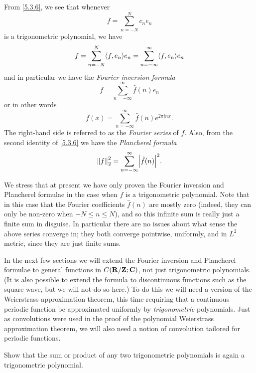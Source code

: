 \begin{additional corollary}\label{ac 5.3.1}
From \cref{5.3.6}, we see that whenever
\[
  f = \sum_{n = -N}^N c_n e_n
\]
is a trigonometric polynomial, we have
\[
  f = \sum_{n = -N}^N \inner*{f, e_n} e_n = \sum_{n = -\infty}^\infty \inner*{f, e_n} e_n
\]
and in particular we have the \emph{Fourier inversion formula}
\[
  f = \sum_{n = -\infty}^\infty \hat{f}(n) e_n
\]
or in other words
\[
  f(x) = \sum_{n = -\infty}^\infty \hat{f}(n) e^{2 \pi i n x}.
\]
The right-hand side is referred to as the \emph{Fourier series} of \(f\).
Also, from the second identity of \cref{5.3.6} we have the \emph{Plancherel formula}
\[
  \norm*{f}_2^2 = \sum_{n = -\infty}^\infty \abs{\hat{f}(n)}^2.
\]
\end{additional corollary}

\begin{remark}\label{5.3.8}
  We stress that at present we have only proven the Fourier inversion and Plancherel formulae in the case when \(f\) is a trigonometric polynomial.
  Note that in this case that the Fourier coefficients \(\hat{f}(n)\) are mostly zero (indeed, they can only be non-zero when \(-N \leq n \leq N\)), and so this infinite sum is really just a finite sum in disguise.
  In particular there are no issues about what sense the above series converge in;
  they both converge pointwise, uniformly, and in \(L^2\) metric, since they are just finite sums.
\end{remark}

\begin{note}
  In the next few sections we will extend the Fourier inversion and Plancherel formulae to general functions in \(C(\mathbf{R} / \mathbf{Z} ; \mathbf{C})\), not just trigonometric polynomials.
  (It is also possible to extend the formula to discontinuous functions such as the square wave, but we will not do so here.)
  To do this we will need a version of the Weierstrass approximation theorem, this time requiring that a continuous periodic function be approximated uniformly by \emph{trigonometric} polynomials.
  Just as convolutions were used in the proof of the polynomial Weierstrass approximation theorem, we will also need a notion of convolution tailored for periodic functions.
\end{note}

\exercisesection

\begin{exercise}\label{ex 5.3.1}
  Show that the sum or product of any two trigonometric polynomials is again a trigonometric polynomial.
\end{exercise}

